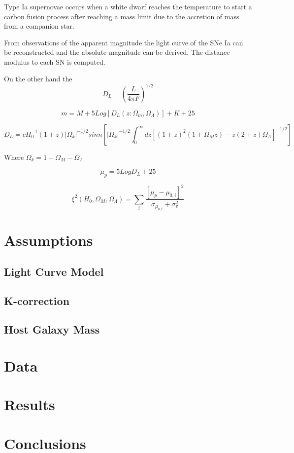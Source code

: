 \documentclass[11pt]{article}
\begin{document}
Type Ia supernovae occurs when a white dwarf reaches the temperature
to start a carbon fusion process  after reaching a mass limit due to
the accretion of mass from a companion star.

From observations of the apparent magnitude the light curve of the SNe
Ia can be reconstructed and the absolute magnitude can be derived.
The distance modulus to each SN is computed.

On the other hand the 
\begin{equation}
D_L = \left( \dfrac{L}{4\pi F}\right)^{1/2}
\end{equation}

\begin{equation}
m = M + 5Log[D_L(z:\Omega_m, \Omega_{\Lambda})] + K + 25
\end{equation}


\begin{equation}
D_L = cH_{0}^{-1} (1+z)|\Omega_k|^{-1/2} sin n\left[ |\Omega_k|^{-1/2}
\int_0^{\infty} dz[(1+z)^2(1+\Omega_Mz) - z(2+z)\Omega_{\Lambda}]^{-1/2}\right]
\end{equation}

Where $\Omega_k = 1 - \Omega_M - \Omega_{\Lambda}$

\begin{equation}
\mu_p = 5 Log D_L + 25
\end{equation}


\begin{equation}
\xi^2(H_0, \Omega_M, \Omega_{\Lambda}) = \sum_i
\dfrac{[\mu_p - \mu_{0,i}]^2}{\sigma_{\mu_{0,i}} + \sigma_v^2}
\end{equation}





\section{Assumptions}\label{assumptions}

\subsection{Light Curve Model}

\subsection{K-correction}

\subsection{Host Galaxy Mass}

\section{Data}

\section{Results}

\section{Conclusions}

\end{document}
